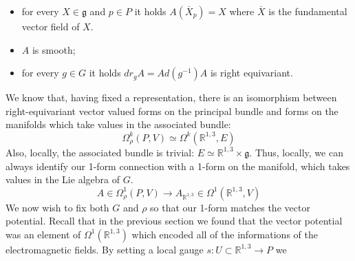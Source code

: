 \documentclass[12pt,a4paper]{report}
\theoremstyle{definition}
\theoremstyle{Theorem}
\theoremstyle{definition}
\theoremstyle{definition}
\begin{document}
	\begin{itemize}
		\item for every $X\in \mathfrak{g}$ and $p\in P$ it holds $A(\overline{X}_p)=X$ where $\overline{X}$ is the fundamental vector field of $X$.
		\item $A$ is smooth;
		\item for every $g\in G$ it holds $dr_gA=Ad(g^{-1})A$ is right equivariant.
	\end{itemize}
	We know that, having fixed a representation, there is an isomorphism between right-equivariant vector valued forms on the principal bundle and forms on the manifolds which take values in the associated bundle:
	$$\Omega_\rho^k(P,V)\simeq \Omega^k(\mathbb{R}^{1,3},E)$$
	Also, locally, the associated bundle is trivial: $E\simeq \mathbb{R}^{1,3}\times \mathfrak{g}$. Thus, locally, we can always identify our 1-form connection with a 1-form on the manifold, which takes values in the Lie algebra of $G$. 
	$$A\in \Omega_\rho^1(P,V)\longrightarrow A_{\mathbb{R}^{1,3}}\in\Omega^1(\mathbb{R}^{1,3},V)$$
	We now wish to fix both $G$ and $\rho$ so that our 1-form matches the vector potential. Recall that in the previous section we found that the vector potential was an element of $\Omega^1(\mathbb{R}^{1,3})$ which encoded all of the informations of the electromagnetic fields. By setting a local gauge $s:U\subset \mathbb{R}^{1,3}\rightarrow P$ we 
	\begin{comment}
		We have said that the vector potential has a symmetry, which from now on will be called gauge symmetry, like:
		$$A\sim A+da$$
		where $a$ is a generic smooth function on the manifold.\\
		\\
		We now wish to construct a Lagrangian describing the electromagnetic field. A priori, we impose the existence of a principal $G$-bundle $(P,\mathbb{R}^{1,3},\pi,G)$ where $G$ is a Lie group.
		It is known that, given a principal bundle  and a finite dimensional representation $\rho:G\rightarrow GL(V)$, we can construct an associated bundle $({P\times V\over \sim},\mathbb{R}^{1,3},\pi_A,G)$ with the equivalence relation:
		$$(p,v)\sim(p\cdot g,\rho(g^{-1})v)$$
		where $g\in G$ and $p\in P$. It was shown in theorem REFERENZA TEOREMA that the exists a 1-1 correspondence of the form:
		$$\Omega^k(P,V)\simeq \Omega^k(\mathbb{R}^{1,3},{P\times V\over \sim})$$
		Moreover, locally, the associated bundle is trivial: ${P\times V\over \sim}\simeq M\times V$. In our setting, the form $A$ belongs to the space $\Omega^1(\mathbb{R}^{1,3})=\Omega^1(\mathbb{R}^{1,3},\mathbb{R})$, so it is a real valued $1$-form on the manifold. Clearly, this form can also be seen as an element of the space $\Omega^1(\mathbb{R}^{1,3},\mathbb{R}^{1,3}\times \mathbb{R})$. Thus, considering $V=\mathbb{R}$ as our vector space, locally, our form is an element of $\Omega^1(\mathbb{R}^{1,3},{P\times \mathbb{R}\over \sim})$. Thus, there exists a corresponding form inside $\Omega^1(P,\mathbb{R})$. Now, to completely fix the principal bundle, we just need specify a representation.
	\end{comment}
	
\end{document}
